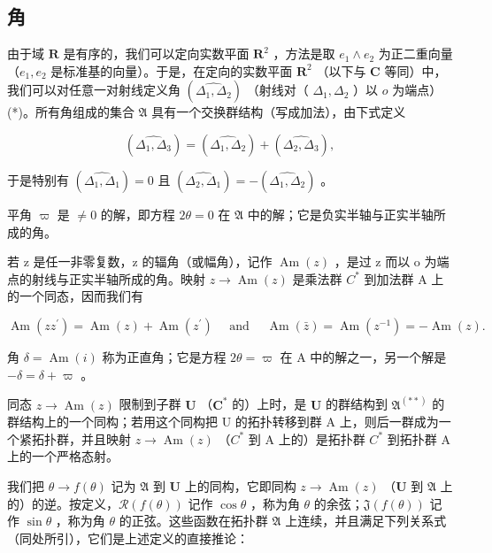 \subsection{角}

由于域 \(\mathbf{R}\) 是有序的，我们可以定向实数平面 \(\mathbf{R}^2\) ，方法是取 \(e_1 \wedge e_2\) 为正二重向量（\(e_1, e_2\) 是标准基的向量）。于是，在定向的实数平面 \(\mathbf{R}^2\) （以下与 \(\mathbf{C}\) 等同）中，我们可以对任意一对射线定义角 \((\widehat{\Delta_1, \Delta_2})\) （射线对（ \(\Delta_1, \Delta_2\) ）以 \(o\) 为端点）(*)。所有角组成的集合 \(\mathfrak{A}\) 具有一个交换群结构（写成加法），由下式定义

\[
(\widehat {\Delta_ {1} , \Delta_ {3}}) = (\widehat {\Delta_ {1} , \Delta_ {2}}) + (\widehat {\Delta_ {2} , \Delta_ {3}}),
\]

于是特别有 \((\widehat{\Delta_1, \Delta_1}) = 0\) 且 \((\widehat{\Delta_2, \Delta_1}) = -(\widehat{\Delta_1, \Delta_2})\) 。

平角 \(\varpi\) 是 \(\neq 0\) 的解，即方程 \(2\theta = 0\) 在 \(\mathfrak{A}\) 中的解；它是负实半轴与正实半轴所成的角。

若 z 是任一非零复数，z 的辐角（或幅角），记作 \(\operatorname{Am}(z)\) ，是过 z 而以 o 为端点的射线与正实半轴所成的角。映射 \(z \to \operatorname{Am}(z)\) 是乘法群 \(C^{*}\) 到加法群 A 上的一个同态，因而我们有

\[
\operatorname{Am} \left(z z ^ {\prime}\right) = \operatorname{Am} (z) + \operatorname{Am} \left(z ^ {\prime}\right) \quad \text { and } \quad \operatorname{Am} (\bar {z}) = \operatorname{Am} \left(z ^ {- 1}\right) = - \operatorname{Am} (z).
\]

角 \(\delta = \operatorname{Am}(i)\) 称为正直角；它是方程 \(2\theta = \varpi\) 在 A 中的解之一，另一个解是 \(-\delta = \delta + \varpi\) 。

同态 \(z \to \operatorname{Am}(z)\) 限制到子群 \(\mathbf{U}\) （\(\mathbf{C}^*\) 的）上时，是 \(\mathbf{U}\) 的群结构到 \(\mathfrak{A}^{(**)}\) 的群结构上的一个同构；若用这个同构把 U 的拓扑转移到群 A 上，则后一群成为一个紧拓扑群，并且映射 \(z \to \operatorname{Am}(z)\) （\(C^{*}\) 到 A 上的）是拓扑群 \(C^{*}\) 到拓扑群 A 上的一个严格态射。

我们把 \(\theta \to f(\theta)\) 记为 \(\mathfrak{A}\) 到 \(\mathbf{U}\) 上的同构，它即同构 \(z \to \operatorname{Am}(z)\) （\(\mathbf{U}\) 到 \(\mathfrak{A}\) 上的）的逆。按定义，\(\mathcal{R}(f(\theta))\) 记作 \(\cos \theta\) ，称为角 \(\theta\) 的余弦；\(\mathfrak{J}(f(\theta))\) 记作 \(\sin \theta\) ，称为角 \(\theta\) 的正弦。这些函数在拓扑群 \(\mathfrak{A}\) 上连续，并且满足下列关系式（同处所引），它们是上述定义的直接推论：

